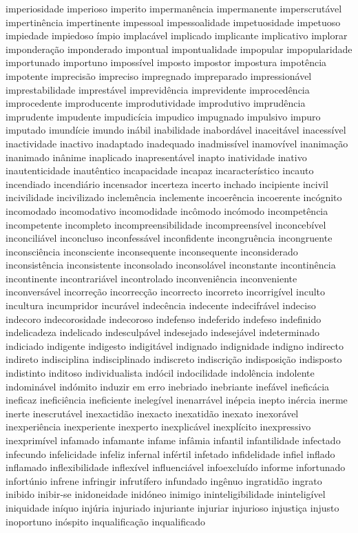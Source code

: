imperiosidade imperioso imperito imperman\^{e}ncia impermanente imperscrut\'{a}vel impertin\^{e}ncia impertinente impessoal impessoalidade impetuosidade impetuoso impiedade impiedoso \'{i}mpio implac\'{a}vel implicado implicante implicativo implorar impondera\c{c}\~ao imponderado impontual impontualidade impopular impopularidade importunado importuno imposs\'{i}vel imposto impostor impostura impot\^{e}ncia impotente imprecis\~ao impreciso impregnado impreparado impression\'{a}vel imprestabilidade imprest\'{a}vel imprevid\^{e}ncia imprevidente improced\^{e}ncia improcedente improducente improdutividade improdutivo imprud\^{e}ncia imprudente impudente impudic\'{i}cia impudico impugnado impulsivo impuro imputado imund\'{i}cie imundo in\'{a}bil inabilidade inabord\'{a}vel inaceit\'{a}vel inacess\'{i}vel inactividade inactivo inadaptado inadequado inadmiss\'{i}vel inamov\'{i}vel inanima\c{c}\~ao inanimado in\^{a}nime inaplicado inapresent\'{a}vel inapto inatividade inativo inautenticidade inaut\^{e}ntico incapacidade incapaz incaracter\'{i}stico incauto incendiado incendi\'{a}rio incensador incerteza incerto inchado incipiente incivil incivilidade incivilizado inclem\^{e}ncia inclemente incoer\^{e}ncia incoerente inc\'{o}gnito incomodado incomodativo incomodidade inc\^{o}modo inc\'{o}modo incompet\^{e}ncia incompetente incompleto incompreensibilidade incompreens\'{i}vel inconceb\'{i}vel inconcili\'{a}vel inconcluso inconfess\'{a}vel inconfidente incongru\^{e}ncia incongruente inconsci\^{e}ncia inconsciente inconsequente inconsequente inconsiderado inconsist\^{e}ncia inconsistente inconsolado inconsol\'{a}vel inconstante incontin\^{e}ncia incontinente incontrari\'{a}vel incontrolado inconveni\^{e}ncia inconveniente inconvers\'{a}vel incorre\c{c}\~ao incorrec\c{c}\~ao incorrecto incorreto incorrig\'{i}vel inculto incultura incumpridor incur\'{a}vel indec\^{e}ncia indecente indecifr\'{a}vel indeciso indecoro indecorosidade indecoroso indefenso indeferido indefeso indefinido indelicadeza indelicado indesculp\'{a}vel indesejado indesej\'{a}vel indeterminado indiciado indigente indigesto indigit\'{a}vel indignado indignidade indigno indirecto indireto indisciplina indisciplinado indiscreto indiscri\c{c}\~ao indisposi\c{c}\~ao indisposto indistinto inditoso individualista ind\'{o}cil indocilidade indol\^{e}ncia indolente indomin\'{a}vel ind\'{o}mito induzir em erro inebriado inebriante inef\'{a}vel inefic\'{a}cia ineficaz inefici\^{e}ncia ineficiente ineleg\'{i}vel inenarr\'{a}vel in\'{e}pcia inepto in\'{e}rcia inerme inerte inescrut\'{a}vel inexactid\~ao inexacto inexatid\~ao inexato inexor\'{a}vel inexperi\^{e}ncia inexperiente inexperto inexplic\'{a}vel inexpl\'{i}cito inexpressivo inexprim\'{i}vel infamado infamante infame inf\^{a}mia infantil infantilidade infectado infecundo infelicidade infeliz infernal inf\'{e}rtil infetado infidelidade infiel inflado inflamado inflexibilidade inflex\'{i}vel influenci\'{a}vel infoexclu\'{i}do informe infortunado infort\'{u}nio infrene infringir infrut\'{i}fero infundado ing\^{e}nuo ingratid\~ao ingrato inibido inibir-se inidoneidade inid\'{o}neo inimigo ininteligibilidade inintelig\'{i}vel iniquidade in\'{i}quo inj\'{u}ria injuriado injuriante injuriar injurioso injusti\c{c}a injusto inoportuno in\'{o}spito inqualifica\c{c}\~ao inqualificado 